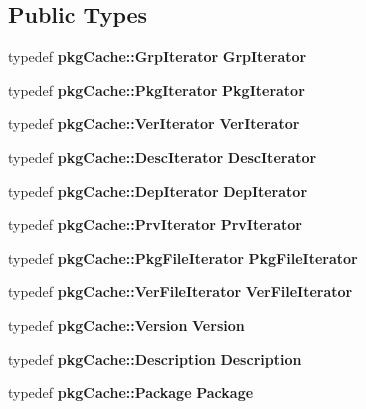 \subsection*{\-Public \-Types}
\begin{DoxyCompactItemize}
\item 
typedef {\bf pkg\-Cache\-::\-Grp\-Iterator} {\bfseries \-Grp\-Iterator}\label{classpkgCache_1_1Namespace_ae81da2a031acdefccb48a27e7470c2a1}

\item 
typedef {\bf pkg\-Cache\-::\-Pkg\-Iterator} {\bfseries \-Pkg\-Iterator}\label{classpkgCache_1_1Namespace_a9ad5af2a8fa2d8b81603d90fd34b6129}

\item 
typedef {\bf pkg\-Cache\-::\-Ver\-Iterator} {\bfseries \-Ver\-Iterator}\label{classpkgCache_1_1Namespace_ab64c9bacccaa7738461bdb238c3dcac3}

\item 
typedef {\bf pkg\-Cache\-::\-Desc\-Iterator} {\bfseries \-Desc\-Iterator}\label{classpkgCache_1_1Namespace_a6cdf5898ef298fabc1ebd101473946d0}

\item 
typedef {\bf pkg\-Cache\-::\-Dep\-Iterator} {\bfseries \-Dep\-Iterator}\label{classpkgCache_1_1Namespace_ac87e5dd3b8b2e754f9cc66c8aeee4bf7}

\item 
typedef {\bf pkg\-Cache\-::\-Prv\-Iterator} {\bfseries \-Prv\-Iterator}\label{classpkgCache_1_1Namespace_a83ffc5e1a16b9c12d3400cdbbb229711}

\item 
typedef {\bf pkg\-Cache\-::\-Pkg\-File\-Iterator} {\bfseries \-Pkg\-File\-Iterator}\label{classpkgCache_1_1Namespace_ac373cca2f5b58c27892a031b44f318d8}

\item 
typedef {\bf pkg\-Cache\-::\-Ver\-File\-Iterator} {\bfseries \-Ver\-File\-Iterator}\label{classpkgCache_1_1Namespace_a48d2e69bfa9befc06957ee7083c31726}

\item 
typedef {\bf pkg\-Cache\-::\-Version} {\bfseries \-Version}\label{classpkgCache_1_1Namespace_acd8fc75b6801b7750de88007ce5bead8}

\item 
typedef {\bf pkg\-Cache\-::\-Description} {\bfseries \-Description}\label{classpkgCache_1_1Namespace_a10afddb154f24ab4c8c22044b150c191}

\item 
typedef {\bf pkg\-Cache\-::\-Package} {\bfseries \-Package}\label{classpkgCache_1_1Namespace_a1e2df1fb1124515534ab29a88b56113f}


\end{DoxyCompactItemize}
